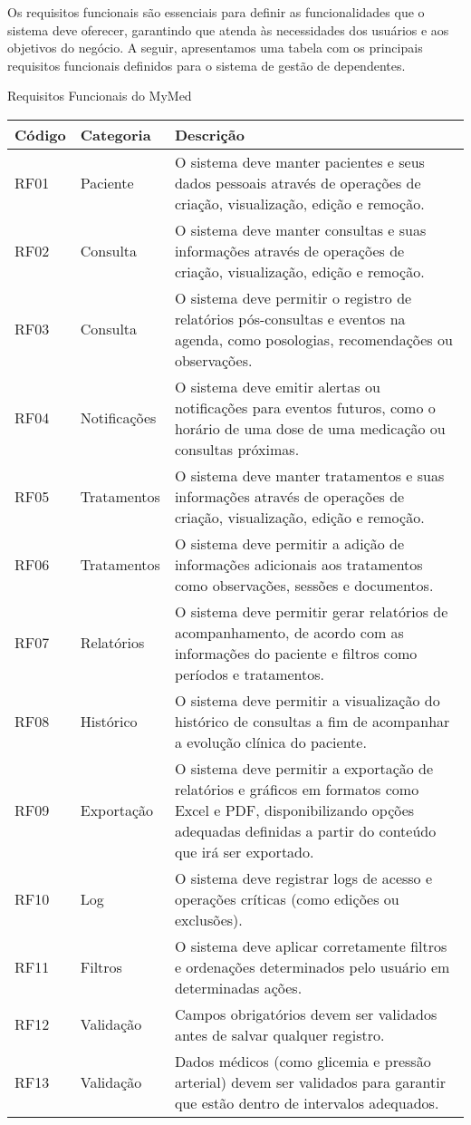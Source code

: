 Os requisitos funcionais são essenciais para definir as funcionalidades que o sistema deve oferecer, garantindo que atenda às necessidades dos usuários e aos objetivos do negócio. A seguir, apresentamos uma tabela com os principais requisitos funcionais definidos para o sistema de gestão de dependentes.

\begin{quadro}
\caption{Requisitos Funcionais do MyMed}
\begin{tabularx}{\textwidth}{|l|l|X|}
\hline
\textbf{Código} & \textbf{Categoria} & \textbf{Descrição} \\ \hline
RF01 & Paciente & O sistema deve manter pacientes e seus dados pessoais através de operações de criação, visualização, edição e remoção. \\ \hline
RF02 & Consulta & O sistema deve manter consultas e suas informações através de operações de criação, visualização, edição e remoção. \\ \hline
RF03 & Consulta & O sistema deve permitir o registro de relatórios pós-consultas e eventos na agenda, como posologias, recomendações ou observações. \\ \hline
RF04 & Notificações & O sistema deve emitir alertas ou notificações para eventos futuros, como o horário de uma dose de uma medicação ou consultas próximas. \\ \hline
RF05 & Tratamentos & O sistema deve manter tratamentos e suas informações através de operações de criação, visualização, edição e remoção. \\ \hline
RF06 & Tratamentos & O sistema deve permitir a adição de informações adicionais aos tratamentos como observações, sessões e documentos. \\ \hline
RF07 & Relatórios & O sistema deve permitir gerar relatórios de acompanhamento, de acordo com as informações do paciente e filtros como períodos e tratamentos. \\ \hline
RF08 & Histórico & O sistema deve permitir a visualização do histórico de consultas a fim de acompanhar a evolução clínica do paciente. \\ \hline
RF09 & Exportação & O sistema deve permitir a exportação de relatórios e gráficos em formatos como Excel e PDF, disponibilizando opções adequadas definidas a partir do conteúdo que irá ser exportado. \\ \hline
RF10 & Log & O sistema deve registrar logs de acesso e operações críticas (como edições ou exclusões). \\ \hline
RF11 & Filtros & O sistema deve aplicar corretamente filtros e ordenações determinados pelo usuário em determinadas ações. \\ \hline
RF12 & Validação & Campos obrigatórios devem ser validados antes de salvar qualquer registro. \\ \hline
RF13 & Validação & Dados médicos (como glicemia e pressão arterial) devem ser validados para garantir que estão dentro de intervalos adequados. \\ \hline
\end{tabularx}
\end{quadro}